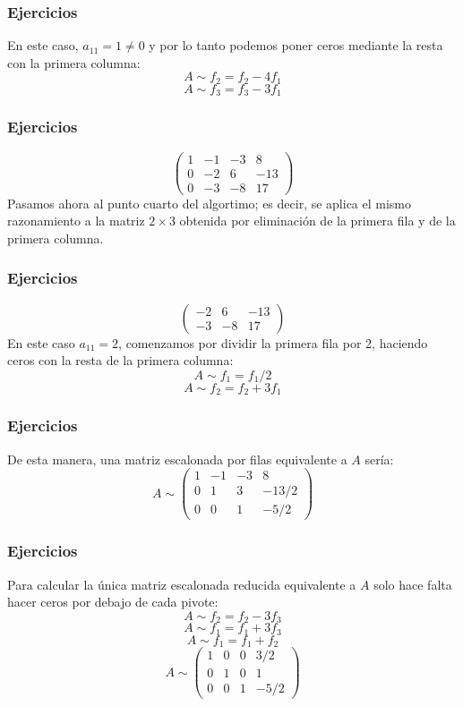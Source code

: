 \documentclass[aspectratio=169]{beamer}
\begin{document}
     \begin{frame}
  \frametitle{Ejercicios}

En este caso, $a_{11}=1\neq0$ y por lo tanto podemos poner ceros mediante la resta con la primera columna:
\[A \sim f_2 = f_2-4f_1\]
\[A\sim f_3 = f_3-3f_1\]
  \end{frame}
  
  
       \begin{frame}
  \frametitle{Ejercicios}

\[\left(\begin{array}{cccc}1 & -1 & -3 & 8 \\0 & -2 & 6 & -13 \\0 & -3 & -8 & 17\end{array}\right)\]
Pasamos ahora al punto cuarto del algortimo; es decir, se aplica el mismo razonamiento a la matriz $2\times3$ obtenida por eliminaci\'on de la primera fila y de la primera columna.
  \end{frame}  
  
  
  \begin{frame}
  \frametitle{Ejercicios}
\[\left(\begin{array}{ccc} -2 & 6 & -13 \\ -3 & -8 & 17\end{array}\right)\]
En este caso $a_{11} = 2$, comenzamos por dividir la primera fila por 2, haciendo ceros con la resta de la primera columna:
\[A\sim f_1 = f_1/2\]
\[A\sim f_2 = f_2+3f_1\]
  \end{frame}  
  
    \begin{frame}
  \frametitle{Ejercicios}
De esta manera, una matriz escalonada por filas equivalente a $A$ ser\'ia:
\[A\sim \left(\begin{array}{cccc}1 & -1 & -3 & 8 \\0 & 1 & 3 & -13/2 \\0 & 0 & 1 & -5/2\end{array}\right)\]

  \end{frame}  
  
  
    \begin{frame}
  \frametitle{Ejercicios}
Para calcular la \'unica matriz escalonada reducida equivalente a $A$ solo hace falta hacer ceros por debajo de cada pivote:
\[A\sim f_2 = f_2-3f_3\]
\[A\sim f_1 = f_1+3f_3\]
\[A\sim f_1 = f_1+f_2\]
\[A\sim \left(\begin{array}{cccc}1 & 0 & 0 & 3/2 \\0 & 1 & 0 & 1 \\0 & 0 & 1 & -5/2\end{array}\right)\]
  \end{frame}  
    
\end{document}

